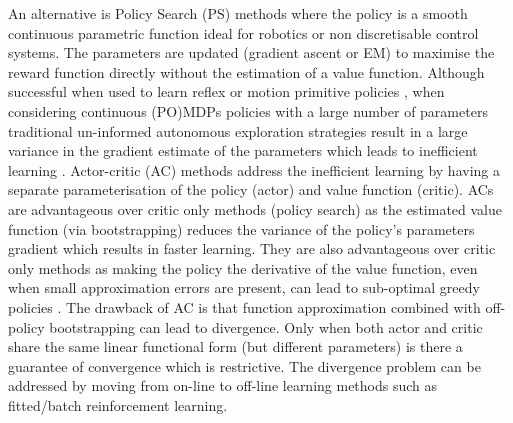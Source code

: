 \documentclass[final,5p,times,twocolumn]{elsarticle}
\begin{document}
An alternative is Policy Search (PS) methods \cite{p_search_surv_2011} where the policy is a smooth continuous
parametric function ideal for robotics or non discretisable control systems. The parameters are updated (gradient ascent or EM) 
to maximise the reward function directly without the estimation of a value function. Although successful 
when used to learn reflex or motion primitive policies \cite{Kormushev2010Humanoids,Calinon2013369}, when considering continuous (PO)MDPs policies
with a large number of parameters traditional un-informed autonomous exploration strategies  result in a large variance in the gradient estimate of the parameters 
which leads to inefficient learning \cite{rl_ac_surv_2012}.
Actor-critic (AC) methods \cite[Chap. 6.6]{sutton1998reinforcement} address 
the inefficient learning by having a separate parameterisation of the policy (actor) and value function 
(critic). ACs are advantageous over critic only methods (policy search) as the estimated value function (via bootstrapping) reduces the variance of 
the policy's parameters gradient which results in faster learning. They are also advantageous over critic only methods as 
making the policy the derivative of the value function, even when small approximation errors are present, can lead 
to sub-optimal greedy policies \cite{Baxter_GPOMDP_2000}. The drawback of AC is that function approximation 
combined with off-policy bootstrapping \cite{Baird95} can lead to divergence. Only when both actor and critic share the same 
linear functional form (but different parameters) is there a guarantee of convergence \cite{Sutton00policygradient} which is 
restrictive. The divergence problem can be addressed by moving from on-line to off-line learning methods such 
as fitted/batch reinforcement learning.

\end{document}
